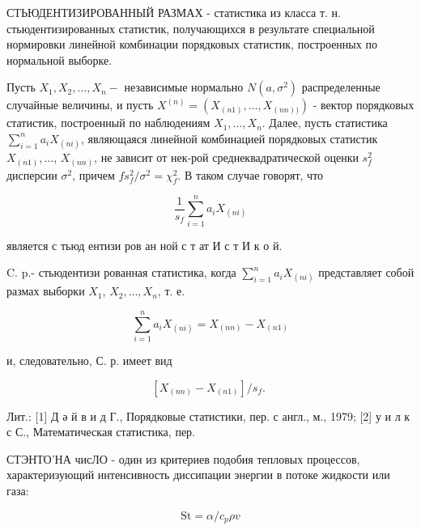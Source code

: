 \documentclass[10pt]{article}
\begin{document}
СТЬЮДЕНТИЗИРОВАННЫЙ РАЗМАХ - статистика из класса т. н. стьюдентизированных статистик, получающихся в результате специальной нормировки линейной комбинации порядковых статистик, построенных по нормальной выборке.



Пусть $X_{1}, X_{2}, \ldots, X_{n}-$ независимые нормально $N\left(a, \sigma^{2}\right)$ распределенные случайные величины, и пусть $X^{(n)}=\left(X_{(n 1)}, \ldots, X_{(n n))}\right)$ - вектор порядковых статистик, построенный по наблюдениям $X_{1}, \ldots, X_{n}$. Далее, пусть статистика $\sum_{i=1}^{n} a_{i} X_{(n i)}$, являющаяся линейной комбинацией порядковых статистик $X_{(n 1)}, \ldots$, $X_{(n n)}$, не зависит от нек-рой среднеквадратической оценки $s_{f}^{2}$ дисперсии $\sigma^{2}$, причем $f s_{f}^{2} / \sigma^{2}=\chi_{f}^{2}$. В таком случае говорят, что



\[

\frac{1}{s_{f}} \sum_{i=1}^{n} a_{i} X_{(n i)}

\]



является с тьюд ентизи ров ан ной с т ат И с т И к о й.



C. p.- стьюдентизи рованная статистика, когда $\sum_{i=1}^{n} a_{i} X_{(n i)}$ представляет собой размах выборки $X_{1}$, $X_{2}, \ldots, X_{n}$, т. е.



\[

\sum_{i=1}^{n} a_{i} X_{(n i)}=X_{(n n)}-X_{(n 1)}

\]



и, следовательно, С. р. имеет вид



\[

\left[X_{(n n)}-X_{(n 1)}\right] / s_{f} \text {. }

\]



Лит.: [1] Д ә й в и д Г., Порядковые статистики, пер. с англ., м., 1979; [2] у и л к с С., Математическая статистика, пер.



СТЭНТО'НА чисЛО - один из критериев подобия тепловых процессов, характеризующий интенсивность диссипации энергии в потоке жидкости или газа:



\[

\mathrm{St}=\alpha / c_{p} \rho v

\]
\end{document}
